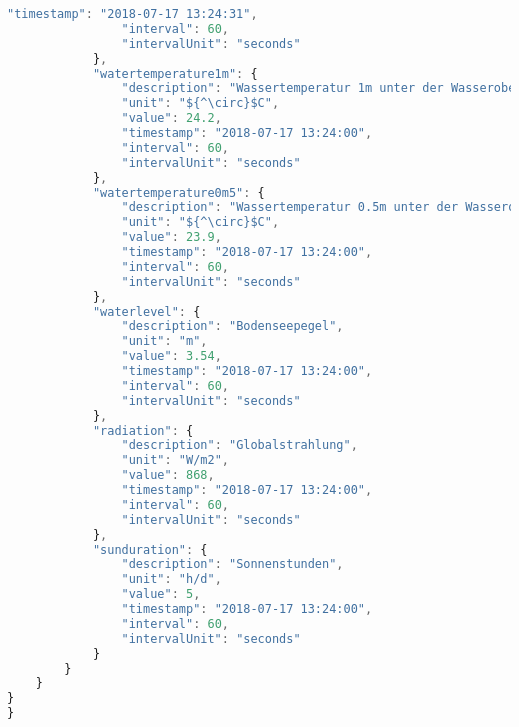 \begin{lstlisting}[label=lst:JsonTree,caption=Json Struktur, language=JavaScript, style=htmlcssjs, mathescape]
                "timestamp": "2018-07-17 13:24:31",
                "interval": 60,
                "intervalUnit": "seconds"
            },
            "watertemperature1m": {
                "description": "Wassertemperatur 1m unter der Wasseroberfläche",
                "unit": "${^\circ}$C",
                "value": 24.2,
                "timestamp": "2018-07-17 13:24:00",
                "interval": 60,
                "intervalUnit": "seconds"
            },
            "watertemperature0m5": {
                "description": "Wassertemperatur 0.5m unter der Wasseroberfläche",
                "unit": "${^\circ}$C",
                "value": 23.9,
                "timestamp": "2018-07-17 13:24:00",
                "interval": 60,
                "intervalUnit": "seconds"
            },
            "waterlevel": {
                "description": "Bodenseepegel",
                "unit": "m",
                "value": 3.54,
                "timestamp": "2018-07-17 13:24:00",
                "interval": 60,
                "intervalUnit": "seconds"
            },
            "radiation": {
                "description": "Globalstrahlung",
                "unit": "W/m2",
                "value": 868,
                "timestamp": "2018-07-17 13:24:00",
                "interval": 60,
                "intervalUnit": "seconds"
            },
            "sunduration": {
                "description": "Sonnenstunden",
                "unit": "h/d",
                "value": 5,
                "timestamp": "2018-07-17 13:24:00",
                "interval": 60,
                "intervalUnit": "seconds"
            }
        }
    }
}
}
\end{lstlisting}



